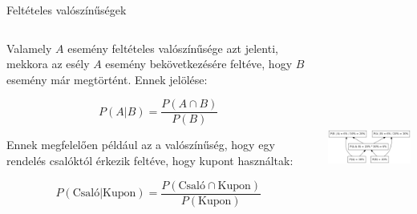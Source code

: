 \documentclass[english, aspectratio=169]{beamer}
\begin{document}
\begin{frame}{Feltételes valószínűségek}
\begin{columns}
\begin{column}{.5\textwidth}
Valamely $A$ esemény feltételes valószínűsége azt jelenti, mekkora az esély $A$ esemény bekövetkezésére feltéve, hogy $B$ esemény már megtörtént. Ennek jelölése:
\begin{block}{}
\[
P\left( A \vert B \right) = \frac{P\left( A \cap B \right)}{P\left( B \right)}
\]
\end{block}
Ennek megfelelően például az a valószínűség, hogy egy rendelés csalóktól érkezik feltéve, hogy kupont használtak: 
\begin{block}{}
\vspace{-.4cm}
\[
P\left( \text{Csaló} \vert	\text{Kupon} \right) = \frac{P\left( \text{Csaló} \cap \text{Kupon} \right)}{P\left( \text{Kupon} \right)}
\]
\end{block}
\end{column}
\begin{column}{.5\textwidth}
\begin{center}
\includegraphics[width=7cm, height=7cm, keepaspectratio]{graphs/generative_1.png}
\end{center}
\end{column}
\end{columns}
\end{frame}
\end{document}
